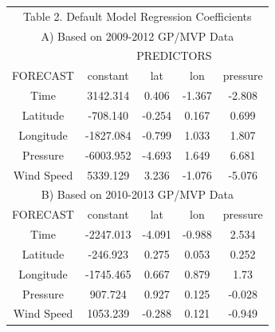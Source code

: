\documentclass[a4paper, 12pt]{article}
\begin{document}
{\begin{table}[!htpb]
\begin{center}
\begin{tabular}{|c||c|c|c|c|}
 \multicolumn{5}{c}{{\normalsize Table 2. Default Model Regression Coefficients}}\\
 \multicolumn{5}{c}{A) Based on 2009-2012 GP/MVP Data} \\
\hline
\multicolumn{1}{|c||}{} & \multicolumn{4}{c|}{PREDICTORS} \\ \hline
\multicolumn{1}{|c||}{FORECAST} & constant & lat & lon & pressure \\ \hline
\multicolumn{1}{|c||}{Time} & 3142.314 & 0.406 & -1.367 & -2.808 \\ \hline
\multicolumn{1}{|c||}{Latitude} & -708.140 &  -0.254 & 0.167 &  0.699 \\ \hline
\multicolumn{1}{|c||}{Longitude} & -1827.084 &  -0.799 &  1.033 & 1.807 \\ \hline
\multicolumn{1}{|c||}{Pressure} &   -6003.952 & -4.693 &  1.649 & 6.681 \\ \hline
\multicolumn{1}{|c||}{Wind Speed} & 5339.129 &  3.236 &  -1.076 & -5.076 \\ \hline\hline
 \multicolumn{5}{c}{B) Based on 2010-2013 GP/MVP Data} \\\hline
 \multicolumn{1}{|c||}{FORECAST} & constant & lat & lon & pressure \\ \hline
\multicolumn{1}{|c||}{Time} & -2247.013 & -4.091 & -0.988 & 2.534 \\ \hline
\multicolumn{1}{|c||}{Latitude} & -246.923 & 0.275 & 0.053 & 0.252 \\ \hline
\multicolumn{1}{|c||}{Longitude} & -1745.465 & 0.667 & 0.879 & 1.73 \\ \hline
\multicolumn{1}{|c||}{Pressure} & 907.724 & 0.927 & 0.125 & -0.028 \\ \hline
\multicolumn{1}{|c||}{Wind Speed} & 1053.239 & -0.288 & 0.121 & -0.949 \\ \hline
\end{tabular}
\end{center}
\vspace{3in}
\end{table}

\newpage

}
\end{document}
